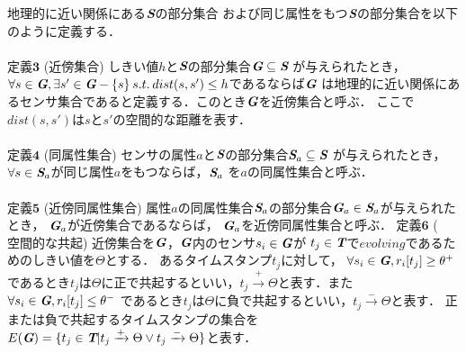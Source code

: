 \documentclass[11pt,j4a]{jarticle}
\begin{document}
地理的に近い関係にある$\textit{\textbf{S}}$の部分集合
および同じ属性をもつ$\textit{\textbf{S}}$の部分集合を以下のように定義する．
\\\\
$\textbf{定義3}$ \hspace{2pt} ($\textbf{近傍集合}$) \hspace{2pt}
しきい値$h$と$\textit{\textbf{S}}$の部分集合$\textit{\textbf{G}} \subseteq \textit{\textbf{S}}$
が与えられたとき，
$\forall s \in \textit{\textbf{G}}, \exists s' \in \textit{\textbf{G}}-\{s\}
\hspace{2pt} s.t. \hspace{2pt} dist(s,s') \leq h$であるならば$\textit{\textbf{G}}$
は地理的に近い関係にあるセンサ集合であると定義する．このとき$\textit{\textbf{G}}$を近傍集合と呼ぶ．
ここで$dist(s,s')$は$s$と$s'$の空間的な距離を表す．
\\\\
$\textbf{定義4}$ \hspace{2pt} ($\textbf{同属性集合}$) \hspace{2pt}
センサの属性$a$と$\textit{\textbf{S}}$の部分集合$\textit{\textbf{S}}_{a} \subseteq \textit{\textbf{S}}$
が与えられたとき，$\forall s \in \textit{\textbf{S}}_{a}$が同じ属性$a$をもつならば，$\textit{\textbf{S}}_{a}$
を$a$の同属性集合と呼ぶ．
\\\\
$\textbf{定義5}$ \hspace{2pt} ($\textbf{近傍同属性集合}$) \hspace{2pt}
属性$a$の同属性集合$\textit{\textbf{S}}_{a}$の部分集合$\textit{\textbf{G}}_{a} \in \textit{\textbf{S}}_{a}$が与えられたとき，
$\textit{\textbf{G}}_{a}$が近傍集合であるならば，
$\textit{\textbf{G}}_{a}$を近傍同属性集合と呼ぶ．
\newpage
$\textbf{定義6}$ \hspace{2pt} ($\textbf{空間的な共起}$) \hspace{2pt}
近傍集合を$\textit{\textbf{G}}$，$\textit{\textbf{G}}$内のセンサ$s_{i} \in \textit{\textbf{G}}$が
$t_{j} \in \textit{\textbf{T}}$で$evolving$であるためのしきい値を$\Theta$とする．
あるタイムスタンプ$t_{j}$に対して，
$\forall s_{i} \in \textit{\textbf{G}},r_{i}[t_{j}] \geq \theta^{+}$
であるとき$t_{j}$は$\Theta$に正で共起するといい，$t_{j} \xrightarrow{+} \Theta$と表す．また
$\forall s_{i} \in \textit{\textbf{G}}, r_{i}[t_{j}] \leq \theta^{-}$
であるとき$t_{j}$は$\Theta$に負で共起するといい，$t_{j} \xrightarrow{-} \Theta$と表す．
正または負で共起するタイムスタンプの集合を
$E(\textit{\textbf{G}})=\{t_{j} \in \textit{\textbf{T}}|t_{j} \xrightarrow{+} \Theta \lor t_{j} \xrightarrow{-} \Theta\}$と表す．
\end{document}
